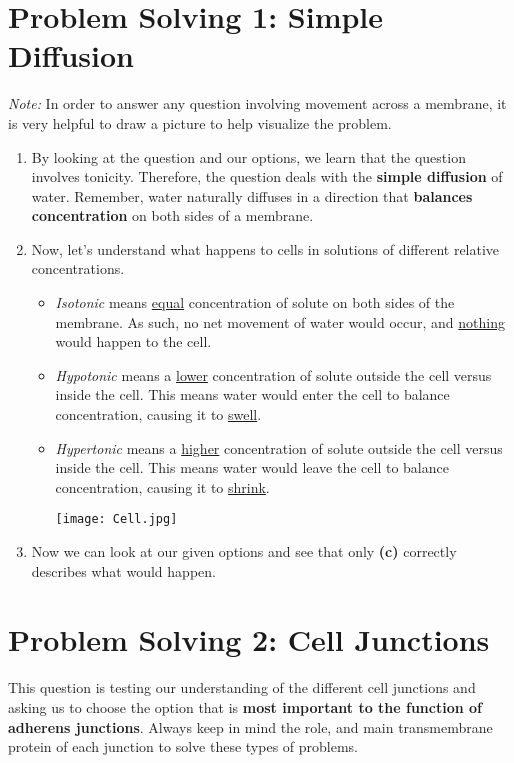 \documentclass[11pt]{article}
\begin{document}
\section*{Problem Solving 1: Simple Diffusion}
\textit{Note:} In order to answer any question involving movement across a membrane, it is very helpful to draw a picture to help visualize the problem.
\begin{enumerate}
	\item By looking at the question and our options, we learn that the question involves tonicity. Therefore, the question deals with the  \textbf{simple diffusion} of water. Remember, water naturally diffuses in a direction that \textbf{balances concentration} on both sides of a membrane.
	\item Now, let's understand what happens to cells in solutions of different relative concentrations. 
	\begin{itemize}
		\item \textit{Isotonic} means \underline{equal} concentration of solute on both sides of the membrane. As such, no net movement of water would occur, and \underline{nothing} would happen to the cell.
		\item \textit{Hypotonic} means a \underline{lower} concentration of solute outside the cell versus inside the cell. This means water would enter the cell to balance concentration, causing it to \underline{swell}.
		\item \textit{Hypertonic} means a \underline{higher} concentration of solute outside the cell versus inside the cell. This means water would leave the cell to balance concentration, causing it to \underline{shrink}.
		\begin{center}
\texttt{[image: Cell.jpg]}
\end{center}
	\end{itemize}
	\item Now we can look at our given options and see that only \textbf{(c)} correctly describes what would happen.

\end{enumerate}

\section*{Problem Solving 2: Cell Junctions}
This question is testing our understanding of the different cell junctions and asking us to choose the option that is \textbf{most important to the function of adherens junctions}. Always keep in mind the role, and main transmembrane protein of each junction to solve these types of problems.  
\end{document}
